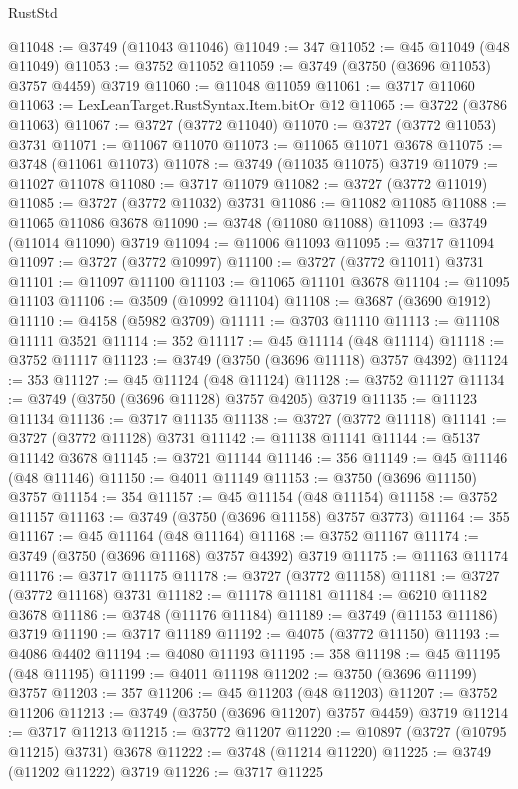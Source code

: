 \begin{lexlean}{RustStd}
\begin{coremodule}
@11048 := @3749 (@11043 @11046)
@11049 := 347
@11052 := @45 @11049 (@48 @11049)
@11053 := @3752 @11052
@11059 := @3749 (@3750 (@3696 @11053) @3757 @4459) @3719
@11060 := @11048 @11059
@11061 := @3717 @11060
@11063 := LexLeanTarget.RustSyntax.Item.bitOr @12
@11065 := @3722 (@3786 @11063)
@11067 := @3727 (@3772 @11040)
@11070 := @3727 (@3772 @11053) @3731
@11071 := @11067 @11070
@11073 := @11065 @11071 @3678
@11075 := @3748 (@11061 @11073)
@11078 := @3749 (@11035 @11075) @3719
@11079 := @11027 @11078
@11080 := @3717 @11079
@11082 := @3727 (@3772 @11019)
@11085 := @3727 (@3772 @11032) @3731
@11086 := @11082 @11085
@11088 := @11065 @11086 @3678
@11090 := @3748 (@11080 @11088)
@11093 := @3749 (@11014 @11090) @3719
@11094 := @11006 @11093
@11095 := @3717 @11094
@11097 := @3727 (@3772 @10997)
@11100 := @3727 (@3772 @11011) @3731
@11101 := @11097 @11100
@11103 := @11065 @11101 @3678
@11104 := @11095 @11103
@11106 := @3509 (@10992 @11104)
@11108 := @3687 (@3690 @1912)
@11110 := @4158 (@5982 @3709)
@11111 := @3703 @11110
@11113 := @11108 @11111 @3521
@11114 := 352
@11117 := @45 @11114 (@48 @11114)
@11118 := @3752 @11117
@11123 := @3749 (@3750 (@3696 @11118) @3757 @4392)
@11124 := 353
@11127 := @45 @11124 (@48 @11124)
@11128 := @3752 @11127
@11134 := @3749 (@3750 (@3696 @11128) @3757 @4205) @3719
@11135 := @11123 @11134
@11136 := @3717 @11135
@11138 := @3727 (@3772 @11118)
@11141 := @3727 (@3772 @11128) @3731
@11142 := @11138 @11141
@11144 := @5137 @11142 @3678
@11145 := @3721 @11144
@11146 := 356
@11149 := @45 @11146 (@48 @11146)
@11150 := @4011 @11149
@11153 := @3750 (@3696 @11150) @3757
@11154 := 354
@11157 := @45 @11154 (@48 @11154)
@11158 := @3752 @11157
@11163 := @3749 (@3750 (@3696 @11158) @3757 @3773)
@11164 := 355
@11167 := @45 @11164 (@48 @11164)
@11168 := @3752 @11167
@11174 := @3749 (@3750 (@3696 @11168) @3757 @4392) @3719
@11175 := @11163 @11174
@11176 := @3717 @11175
@11178 := @3727 (@3772 @11158)
@11181 := @3727 (@3772 @11168) @3731
@11182 := @11178 @11181
@11184 := @6210 @11182 @3678
@11186 := @3748 (@11176 @11184)
@11189 := @3749 (@11153 @11186) @3719
@11190 := @3717 @11189
@11192 := @4075 (@3772 @11150)
@11193 := @4086 @4402
@11194 := @4080 @11193
@11195 := 358
@11198 := @45 @11195 (@48 @11195)
@11199 := @4011 @11198
@11202 := @3750 (@3696 @11199) @3757
@11203 := 357
@11206 := @45 @11203 (@48 @11203)
@11207 := @3752 @11206
@11213 := @3749 (@3750 (@3696 @11207) @3757 @4459) @3719
@11214 := @3717 @11213
@11215 := @3772 @11207
@11220 := @10897 (@3727 (@10795 @11215) @3731) @3678
@11222 := @3748 (@11214 @11220)
@11225 := @3749 (@11202 @11222) @3719
@11226 := @3717 @11225

\end{coremodule}
\end{lexlean}
